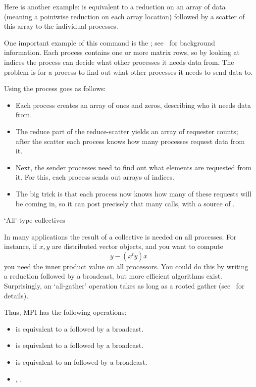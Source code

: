 Here is another example:  is equivalent
to a reduction on an array of data (meaning a pointwise reduction on each
array location) followed by a scatter of this array to the individual 
processes.

One important example of this command is the
;
see~ for background information.
Each process contains one or more matrix rows, so by looking at indices
the process can decide what other processes it needs data from.
The problem is for a process to find out what other processes 
it needs to send data to. 

Using  the process goes as follows:
\begin{itemize}
\item Each process creates an array of ones and zeros, describing who
  it needs data from.
\item The reduce part of the reduce-scatter yields an array of
  requester counts; after the scatter each process knows how many
  processes request data from it.
\item Next, the sender processes need to find out what elements are
  requested from it. For this, each process sends out arrays of
  indices.
\item The big trick is that each process now knows how many of these
  requests will be coming in, so it can post precisely that many
   calls, with a source of .
\end{itemize}

 {`All'-type collectives}

In many applications the result of a collective is needed on all processes.
For instance, if $x,y$ are distributed vector objects, and you want to compute
\[ y- (x^ty)x \]
you need the inner product value on all processors. You could do this
by writing a reduction followed by a broadcast, but more efficient
algorithms exist.  Surprisingly, an `all-gather' operation takes as
long as a rooted gather (see~ for details).

Thus, MPI has the following operations:
\begin{itemize}
\item {} is equivalent to a  followed by a broadcast.
\item {} is equivalent to a  followed by a broadcast.
\item {} is equivalent to an  followed by a broadcast.
\item {}, .
\end{itemize}

